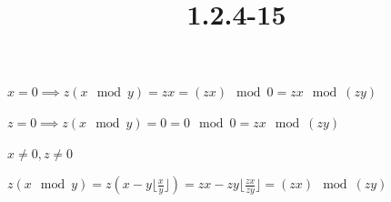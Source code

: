 \documentclass{article}
\title{1.2.4-15}
\begin{document}
\maketitle

$x = 0 \implies z(x \mod y) = zx = (zx) \mod 0 = zx \mod (zy)$

$z = 0 \implies z(x \mod y) = 0 = 0 \mod 0 = zx \mod (zy)$

$x \neq 0, z \neq 0$

$z(x \mod y)=z(x-y\lfloor\frac{x}{y}\rfloor) = zx - zy \lfloor\frac{zx}{zy}\rfloor = (zx) \mod (zy)$
\end{document}
